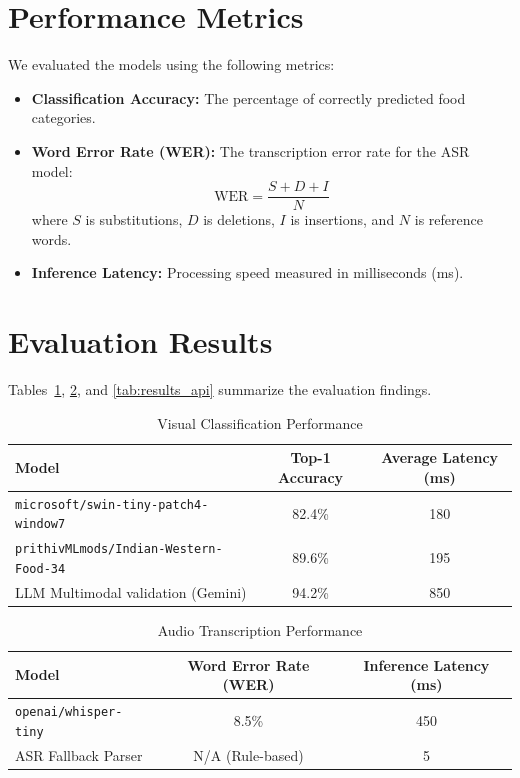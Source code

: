 \documentclass[12pt,a4paper,oneside]{report}
\begin{document}
\section{Performance Metrics}
We evaluated the models using the following metrics:
\begin{itemize}
    \item \textbf{Classification Accuracy:} The percentage of correctly predicted food categories.
    \item \textbf{Word Error Rate (WER):} The transcription error rate for the ASR model:
    \begin{equation}
        \text{WER} = \frac{S + D + I}{N}
    \end{equation}
    where $S$ is substitutions, $D$ is deletions, $I$ is insertions, and $N$ is reference words.
    \item \textbf{Inference Latency:} Processing speed measured in milliseconds (ms).
\end{itemize}

\section{Evaluation Results}
Tables~\ref{tab:results_vision}, \ref{tab:results_asr}, and \ref{tab:results_api} summarize the evaluation findings.

\begin{table}[H]
    \centering
    \caption{Visual Classification Performance}
    \label{tab:results_vision}
    \begin{tabular}{lcc}
        \toprule
        \textbf{Model} & \textbf{Top-1 Accuracy} & \textbf{Average Latency (ms)} \\
        \midrule
        \texttt{microsoft/swin-tiny-patch4-window7} & 82.4\% & 180 \\
        \texttt{prithivMLmods/Indian-Western-Food-34} & 89.6\% & 195 \\
        LLM Multimodal validation (Gemini) & 94.2\% & 850 \\
        \bottomrule
    \end{tabular}
\end{table}

\begin{table}[H]
    \centering
    \caption{Audio Transcription Performance}
    \label{tab:results_asr}
    \begin{tabular}{lcc}
        \toprule
        \textbf{Model} & \textbf{Word Error Rate (WER)} & \textbf{Inference Latency (ms)} \\
        \midrule
        \texttt{openai/whisper-tiny} & 8.5\% & 450 \\
        ASR Fallback Parser & N/A (Rule-based) & 5 \\
        \bottomrule
    \end{tabular}
\end{table}
\end{document}
